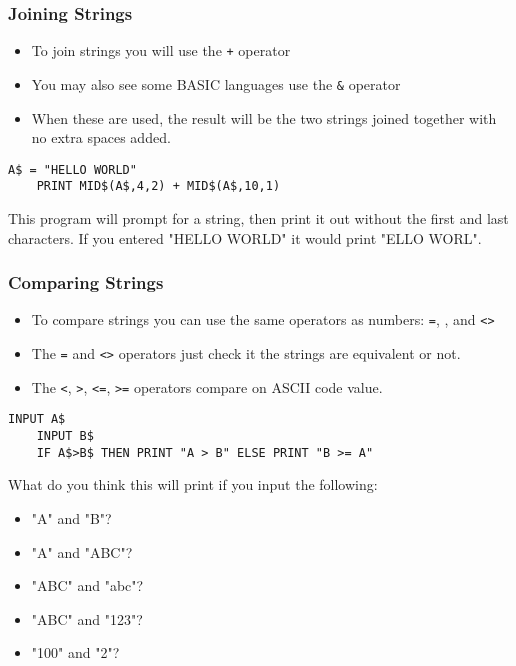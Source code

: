 \documentclass[handout,fleqn, t]{beamer}
\begin{document}
\begin{frame}[fragile]
  \frametitle{Joining Strings}
  
  \begin{itemize}
    \item To join strings you will use the \lstinline{+} operator
    \item You may also see some BASIC languages use the \lstinline{&} operator
    \item When these are used, the result will be the two strings joined together with no extra spaces added.
  \end{itemize}

  \begin{lstlisting}[gobble=4]
    A$ = "HELLO WORLD"
    PRINT MID$(A$,4,2) + MID$(A$,10,1)
  \end{lstlisting}
  
  This program will prompt for a string, then print it out without the first and last characters.  If you entered "HELLO WORLD" it would print "ELLO WORL".
\end{frame}

\begin{frame}[fragile]
  \frametitle{Comparing Strings}
  
  \begin{itemize}
    \item To compare strings you can use the same operators as numbers: \lstinline{=}, , and \lstinline{<>}
    \item The \lstinline{=} and \lstinline{<>} operators just check it the strings are equivalent or not.
    \item The \lstinline{<}, \lstinline{>}, \lstinline{<=}, \lstinline{>=} operators compare on ASCII code value.
  \end{itemize}

  \begin{lstlisting}[gobble=4]
    INPUT A$
    INPUT B$
    IF A$>B$ THEN PRINT "A > B" ELSE PRINT "B >= A"
  \end{lstlisting}
  
  What do you think this will print if you input the following:
  \begin{itemize}
    \item "A" and "B"?
    \item "A" and "ABC"?
    \item "ABC" and "abc"?
    \item "ABC" and "123"?
    \item "100" and "2"?
  \end{itemize}
\end{frame}
\end{document}
